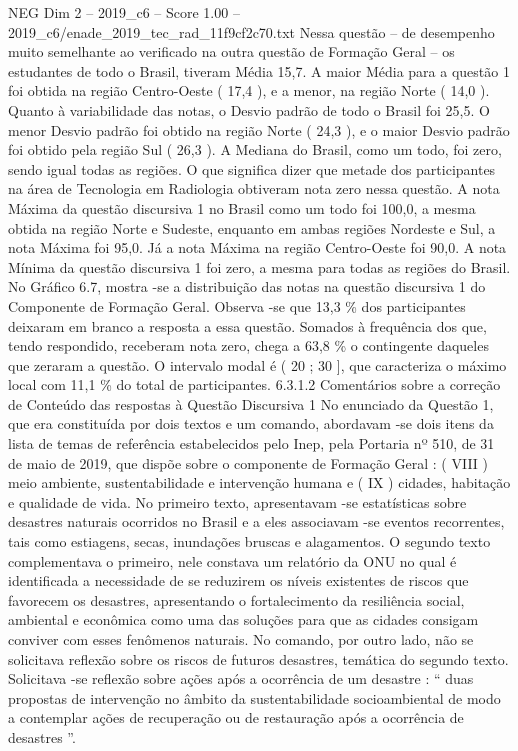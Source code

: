 \begin{textsample}{NEG Dim 2 – 2019\_c6 – Score 1.00 – 2019\_c6/enade\_2019\_tec\_rad\_11f9cf2c70.txt}
Nessa questão – de desempenho muito semelhante ao verificado na outra questão de Formação Geral – os estudantes de todo o Brasil, tiveram Média 15,7.
A maior Média para a questão 1 foi obtida na região Centro-Oeste ( 17,4 ), e a menor, na região Norte ( 14,0 ).
Quanto à variabilidade das notas, o Desvio padrão de todo o Brasil foi 25,5.
O menor Desvio padrão foi obtido na região Norte ( 24,3 ), e o maior Desvio padrão foi obtido pela região Sul ( 26,3 ).
A Mediana do Brasil, como um todo, foi zero, sendo igual todas as regiões.
O que significa dizer que metade dos participantes na área de Tecnologia em Radiologia obtiveram nota zero nessa questão.
A nota Máxima da questão discursiva 1 no Brasil como um todo foi 100,0, a mesma obtida na região Norte e Sudeste, enquanto em ambas regiões Nordeste e Sul, a nota Máxima foi 95,0.
Já a nota Máxima na região Centro-Oeste foi 90,0.
A nota Mínima da questão discursiva 1 foi zero, a mesma para todas as regiões do Brasil.
No Gráfico 6.7, mostra -se a distribuição das notas na questão discursiva 1 do Componente de Formação Geral.
Observa -se que 13,3 \% dos participantes deixaram em branco a resposta a essa questão.
Somados à frequência dos que, tendo respondido, receberam nota zero, chega a 63,8 \% o contingente daqueles que zeraram a questão.
O intervalo modal é ( 20 ; 30 ], que caracteriza o máximo local com 11,1 \% do total de participantes. 6.3.1.2 Comentários sobre a correção de Conteúdo das respostas à Questão Discursiva 1 No enunciado da Questão 1, que era constituída por dois textos e um comando, abordavam -se dois itens da lista de temas de referência estabelecidos pelo Inep, pela Portaria nº 510, de 31 de maio de 2019, que dispõe sobre o componente de Formação Geral : ( VIII ) meio ambiente, sustentabilidade e intervenção humana e ( IX ) cidades, habitação e qualidade de vida.
No primeiro texto, apresentavam -se estatísticas sobre desastres naturais ocorridos no Brasil e a eles associavam -se eventos recorrentes, tais como estiagens, secas, inundações bruscas e alagamentos.
O segundo texto complementava o primeiro, nele constava um relatório da ONU no qual é identificada a necessidade de se reduzirem os níveis existentes de riscos que favorecem os desastres, apresentando o fortalecimento da resiliência social, ambiental e econômica como uma das soluções para que as cidades consigam conviver com esses fenômenos naturais.
No comando, por outro lado, não se solicitava reflexão sobre os riscos de futuros desastres, temática do segundo texto.
Solicitava -se reflexão sobre ações após a ocorrência de um desastre : “ duas propostas de intervenção no âmbito da sustentabilidade socioambiental de modo a contemplar ações de recuperação ou de restauração após a ocorrência de desastres ”.

\end{textsample}
